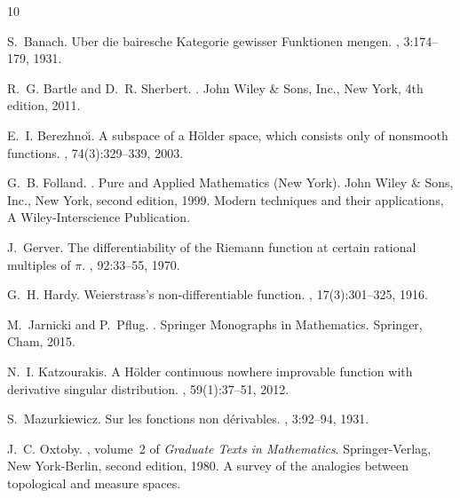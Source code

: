 \documentclass[12pt]{amsart}
\numberwithin{equation}{section}
\theoremstyle{definition}
\theoremstyle{remark}
\begin{document}
 
\begin{thebibliography}{10}

S.~Banach.
\newblock Uber die bairesche {K}ategorie gewisser {F}unktionen mengen.
, 3:174--179, 1931.

R.~G. Bartle and D.~R. Sherbert.
.
\newblock John Wiley \& Sons, Inc., New York, 4th edition, 2011.

E.~I. Berezhno\u{\i}.
\newblock A subspace of a {H}\"older space, which consists only of nonsmooth
  functions.
, 74(3):329--339, 2003.

G.~B. Folland.
.
\newblock Pure and Applied Mathematics (New York). John Wiley \& Sons, Inc.,
  New York, second edition, 1999.
\newblock Modern techniques and their applications, A Wiley-Interscience
  Publication.

J.~Gerver.
\newblock The differentiability of the {R}iemann function at certain rational
  multiples of {$\pi $}.
, 92:33--55, 1970.

G.~H. Hardy.
\newblock Weierstrass's non-differentiable function.
, 17(3):301--325, 1916.

M.~Jarnicki and P.~Pflug.
.
\newblock Springer Monographs in Mathematics. Springer, Cham, 2015.

N.~I. Katzourakis.
\newblock A {H}\"{o}lder continuous nowhere improvable function with derivative
  singular distribution.
, 59(1):37--51, 2012.

S.~Mazurkiewicz.
\newblock Sur les fonctions non d\'erivables.
, 3:92--94, 1931.

J.~C. Oxtoby.
, volume~2 of {\em Graduate Texts in
  Mathematics}.
\newblock Springer-Verlag, New York-Berlin, second edition, 1980.
\newblock A survey of the analogies between topological and measure spaces.

\end{thebibliography}
\end{document}
